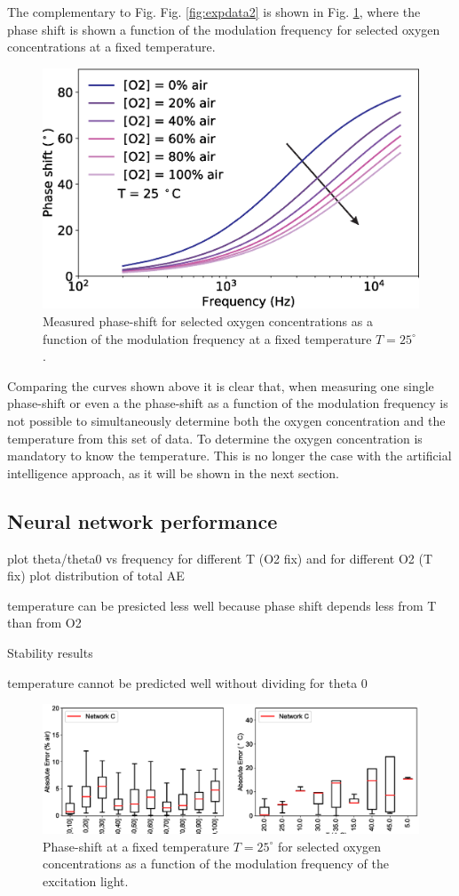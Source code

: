 \documentclass[9pt,twocolumn,twoside,pdftex]{optica}
\begin{document}
The complementary to Fig. Fig. \ref{fig:expdata2} is shown in Fig. \ref{fig:expdata3}, where the phase shift is shown a function of the modulation frequency for selected oxygen concentrations at a fixed temperature.

\begin{figure}[htbp]
\centering
\includegraphics[width=8 cm]{phase_f_O2.eps}
\caption{Measured phase-shift for selected oxygen concentrations as a function of the modulation frequency at a fixed temperature $T=25 ^{\circ}$ .}
\label{fig:expdata3}
\end{figure}

Comparing the curves shown above it is clear that, when measuring one single phase-shift or even a the phase-shift as a function of the modulation frequency is not possible to simultaneously determine both the oxygen concentration and the temperature from this set of data. To determine the oxygen concentration is mandatory to know the temperature. This is no longer the case with the artificial intelligence approach, as it will be shown in the next section. 

\subsection{Neural network performance}

plot theta/theta0 vs frequency for different T (O2 fix) and for different O2 (T fix)
plot distribution of total AE

temperature can be presicted less well because phase shift depends less from T than from O2

Stability results

temperature cannot be predicted well without dividing for theta 0

\begin{figure}[htbp]
\centering
\includegraphics[width=9 cm]{results_theta90.eps}
\caption{Phase-shift at a fixed temperature $T=25 ^{\circ}$ for selected oxygen concentrations as a function of the modulation frequency of the excitation light.}
\label{fig:result_90}
\end{figure}
\end{document}
